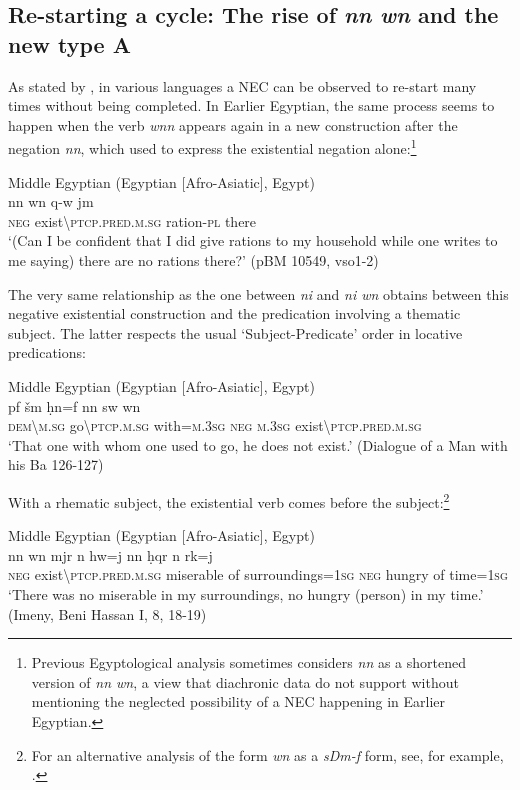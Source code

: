 \documentclass[output=paper,draft,draftmode,colorlinks,citecolor=brown]{langscibook}
\begin{document}
\subsection{Re-starting a cycle: The rise of \textit{nn wn} and the new type A}\label{s:AE2-5}

As stated by \citet[174]{Veselinova2016}, in various languages a NEC can be observed to re-start many times without being completed. In Earlier Egyptian, the same process seems to happen when the verb \textit{wnn} appears again in a new construction after the negation \textit{nn}, which used to express the existential negation alone:\footnote{Previous Egyptological analysis sometimes considers \textit{nn} as a shortened version of \textit{nn wn}, a view that diachronic data do not support without mentioning the neglected possibility of a NEC happening in Earlier Egyptian. }  
 
\ea Middle Egyptian (Egyptian [Afro-Asiatic], Egypt) \label{ex:AE37}\\
    \gll nn wn {\ꜥ}q-w jm  \\
    \textsc{neg} exist\textbackslash\textsc{ptcp.pred.m.sg} ration-\textsc{pl} there\\ 
    \glt ‘(Can I be confident that I did give rations to my household while one writes to me saying) there are no rations there?’ (pBM 10549, vso1-2) 
\z 
 
The very same relationship as the one between \textit{ni} and \textit{ni wn} obtains between this negative existential construction and the predication involving a thematic subject. The latter respects the usual ‘Subject-Predicate’ order in locative predications: 

\ea Middle Egyptian (Egyptian [Afro-Asiatic], Egypt) \label{ex:AE38}\\
    \gll pf{\ꜣ} šm ḥn{\ꜥ}=f nn sw wn\\
    \textsc{dem\textbackslash m.sg} go\textbackslash\textsc{ptcp.m.sg} with=\textsc{m.3sg} \textsc{neg} \textsc{m.3sg} exist\textbackslash\textsc{ptcp.pred.m.sg}\\ 
    \glt ‘That one with whom one used to go, he does not exist.’ (Dialogue of a Man with his Ba 126-127) 
\z 
 
 With a rhematic subject, the existential verb comes before the subject:\footnote{For an alternative analysis of the form \textit{wn} as a \textit{sDm-f} form, see, for example, \citet{Uljas2013}.}
 
\ea Middle Egyptian (Egyptian [Afro-Asiatic], Egypt) \label{ex:AE39}\\
    \gll nn wn m{\ꜣ}jr n h{\ꜣ}w=j nn ḥqr n rk=j\\
    \textsc{neg} exist\textbackslash\textsc{ptcp.pred.m.sg} miserable of surroundings=\textsc{1sg} \textsc{neg} hungry of time=\textsc{1sg}\\ 
    \glt ‘There was no miserable in my surroundings, no hungry (person) in my time.’ (Imeny, Beni Hassan I, 8, 18-19) 
\z
\end{document}
